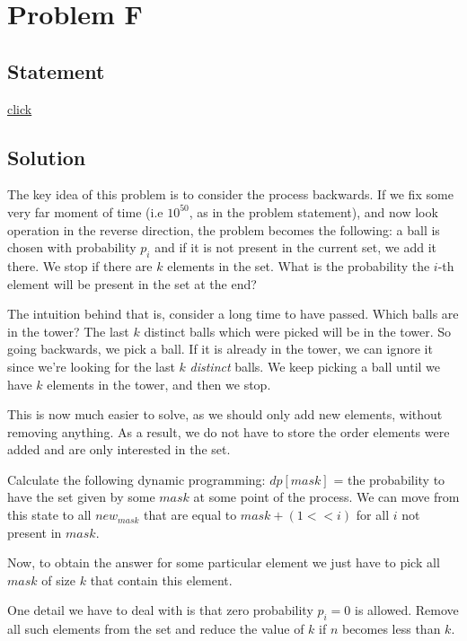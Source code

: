 \section{Problem F}
	\subsection{Statement}
		\href{http://foobar.iiitd.edu.in/contest/team/problem.php?id=532}{click}

	\subsection{Solution}
		The key idea of this problem is to consider the process backwards. If we fix some very far moment of time (i.e $10^{50}$, as in the problem statement), and now look operation in the reverse direction, the problem becomes the following: a ball is chosen with probability $p_i$ and if it is not present in the current set, we add it there. We stop if there are $k$ elements in the set. What is the probability the $i$-th element will be present in the set at the end? 

		The intuition behind that is, consider a long time to have passed. Which balls are in the tower? The last $k$ distinct balls which were picked will be in the tower. So going backwards, we pick a ball. If it is already in the tower, we can ignore it since we're looking for the last $k$ \emph{distinct} balls. We keep picking a ball until we have $k$ elements in the tower, and then we stop.

		This is now much easier to solve, as we should only add new elements, without removing anything. As a result, we do not have to store the order elements were added and are only interested in the set. 

		Calculate the following dynamic programming: $dp[mask]$ = the probability to have the set given by some $mask$ at some point of the  process. We can move from this state to all $new_{mask}$ that are equal to $mask + (1 << i)$ for all $i$ not present in $mask$.

		Now, to obtain the answer for some particular element we just have to pick all $mask$ of size $k$ that contain this element.

		One detail we have to deal with is that zero probability $p_i = 0$ is allowed. Remove all such elements from the set and reduce the value of $k$ if $n$ becomes less than $k$.